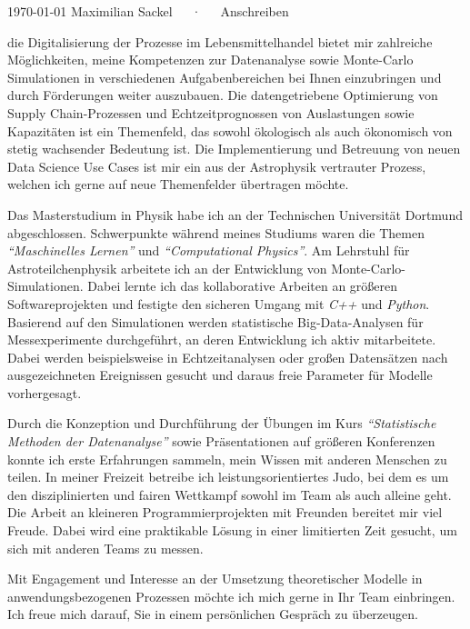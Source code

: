 \documentclass[11pt, a4paper]{Awesome-CV/awesome-cv}
\begin{document}
\makecvheader[R]

\makecvfooter
{\today}
{Maximilian Sackel~~~·~~~Anschreiben}
{}

\makelettertitle

\begin{cvletter}
    die Digitalisierung der Prozesse im Lebensmittelhandel bietet mir
    zahlreiche Möglichkeiten, meine Kompetenzen zur Datenanalyse sowie Monte-Carlo Simulationen in
    verschiedenen Aufgabenbereichen bei Ihnen einzubringen und durch Förderungen weiter auszubauen.
    Die datengetriebene Optimierung von Supply Chain-Prozessen und
    Echtzeitprognossen von Auslastungen sowie Kapazitäten ist ein Themenfeld,
    das sowohl ökologisch als auch ökonomisch von stetig wachsender Bedeutung
    ist.
    Die Implementierung und Betreuung von neuen Data Science Use Cases ist mir
    ein aus der Astrophysik vertrauter Prozess,
    welchen ich gerne auf neue Themenfelder übertragen möchte.

    Das Masterstudium in Physik habe ich an der Technischen Universität Dortmund
    abgeschlossen.
    Schwerpunkte während meines Studiums waren die Themen \textit{``Maschinelles Lernen''} und \textit{``Computational Physics''}.
    Am Lehrstuhl für Astroteilchenphysik arbeitete ich an der Entwicklung von Monte-Carlo-Simulationen.
    Dabei lernte ich das kollaborative Arbeiten an größeren Softwareprojekten und festigte den sicheren Umgang mit \textit{C++} und \textit{Python}.
    Basierend auf den Simulationen werden statistische Big-Data-Analysen für
    Messexperimente durchgeführt, an deren Entwicklung ich aktiv mitarbeitete.
    Dabei werden beispielsweise in Echtzeitanalysen oder großen Datensätzen
    nach ausgezeichneten Ereignissen gesucht und daraus freie Parameter für Modelle vorhergesagt.

    Durch die Konzeption und Durchführung der Übungen im Kurs
    \textit{``Statistische Methoden der Datenanalyse''} sowie Präsentationen
    auf größeren Konferenzen konnte ich erste Erfahrungen sammeln, mein Wissen mit anderen Menschen
zu teilen. In meiner Freizeit betreibe ich leistungsorientiertes Judo, bei dem es um den disziplinierten und fairen Wettkampf sowohl im Team als auch alleine geht. Die Arbeit an kleineren Programmierprojekten mit Freunden bereitet mir
viel Freude. Dabei wird eine praktikable Lösung in einer limitierten Zeit gesucht, um sich mit anderen Teams zu messen.

    Mit Engagement und Interesse an der Umsetzung theoretischer Modelle in anwendungsbezogenen Prozessen möchte ich mich gerne in Ihr Team einbringen.
    Ich freue mich darauf, Sie in einem persönlichen Gespräch zu überzeugen.

\end{cvletter}


\makeletterclosing
\end{document}
